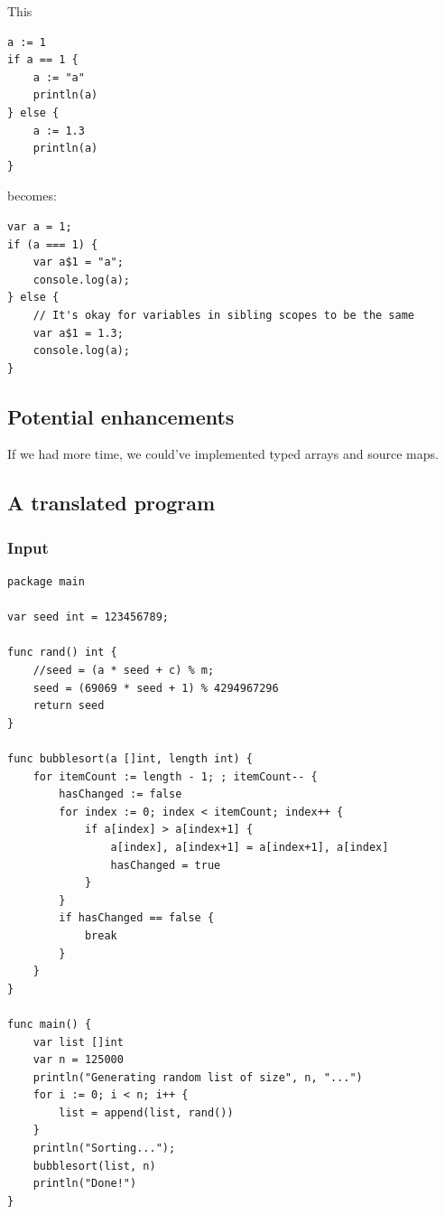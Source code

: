 \documentclass[oneside]{article}
\begin{document}
This
\begin{verbatim}
a := 1
if a == 1 {
    a := "a"
    println(a)
} else {
    a := 1.3
    println(a)
}
\end{verbatim}

becomes:

\begin{verbatim}
var a = 1;
if (a === 1) {
    var a$1 = "a";
    console.log(a);
} else {
    // It's okay for variables in sibling scopes to be the same
    var a$1 = 1.3;
    console.log(a);
}
\end{verbatim}

\subsection{Potential enhancements}
If we had more time, we could've implemented typed arrays and source maps.

\subsection{A translated program}
\subsubsection{Input}
\begin{verbatim}
package main

var seed int = 123456789;

func rand() int {
	//seed = (a * seed + c) % m;
	seed = (69069 * seed + 1) % 4294967296
	return seed
}

func bubblesort(a []int, length int) {
    for itemCount := length - 1; ; itemCount-- {
        hasChanged := false
        for index := 0; index < itemCount; index++ {
            if a[index] > a[index+1] {
                a[index], a[index+1] = a[index+1], a[index]
                hasChanged = true
            }
        }
        if hasChanged == false {
            break
        }
    }
}

func main() {
	var list []int
	var n = 125000
	println("Generating random list of size", n, "...")
	for i := 0; i < n; i++ {
		list = append(list, rand())
	}
	println("Sorting...");
	bubblesort(list, n)
	println("Done!")
}
\end{verbatim}
\end{document}
